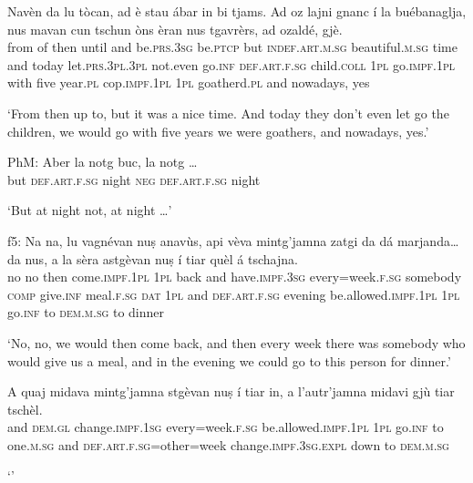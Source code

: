 \begin{linenumbers}
\gll    Navèn da lu tòcan, ad è stau ábar in bi tjams. Ad oz lajni gnanc í la buébanaglja, nus mavan cun tschun òns èran nus tgavrèrs, ad ozaldé, gjè.\\
from of then until and  be.\textsc{prs.3sg} be.\textsc{ptcp} but \textsc{indef.art.m.sg} beautiful.\textsc{m.sg} time and today let.\textsc{prs.3pl.3pl} not.even go.\textsc{inf} \textsc{def.art.f.sg} child.\textsc{coll} \textsc{1pl} go.\textsc{impf.1pl} with five year.\textsc{pl}  cop.\textsc{impf.1pl} \textsc{1pl} goatherd.\textsc{pl} and nowadays, yes{}    \\
\end{linenumbers}
\medskip
\glt `From then up to, but it was a nice time. And today they don’t even let go the children, we would go with five years we were goathers, and nowadays, yes.'
\medskip

\begin{linenumbers}
\gll  PhM: Aber la notg buc, la notg …\\
\textsc{} but \textsc{def.art.f.sg} night  \textsc{neg} \textsc{def.art.f.sg} night  \\
\end{linenumbers}
\medskip
\glt `But at night not, at night …'
\medskip

\begin{linenumbers}
\gll f5: Na na, lu vagnévan nuṣ anavùs, api vèva mintg’jamna zatgi da dá marjanda… da nus, a la sèra astgèvan nuṣ í tiar quèl á tschajna.\\
\textsc{} no no then come.\textsc{impf.1pl} \textsc{1pl} back and have.\textsc{impf.3sg} every=week.\textsc{f.sg} somebody   \textsc{comp} give.\textsc{inf} meal.\textsc{f.sg} \textsc{dat} \textsc{1pl} and \textsc{def.art.f.sg} evening be.allowed.\textsc{impf.1pl} \textsc{1pl} go.\textsc{inf} to \textsc{dem.m.sg} to dinner\\
\end{linenumbers}
\medskip
\glt `No, no, we would then come back, and then every week there was somebody who would give us a meal, and in the evening we could go to this person for dinner.'
\medskip

\begin{linenumbers}
\gll    A quaj midava mintg’jamna stgèvan nuṣ í tiar in, a l’autr’jamna midavi gjù tiar tschèl. \\
and \textsc{dem.gl} change.\textsc{impf.1sg} every=week.\textsc{f.sg} be.allowed.\textsc{impf.1pl}  \textsc{1pl} go.\textsc{inf} to one.\textsc{m.sg} and \textsc{def.art.f.sg=}other=week   change.\textsc{impf.3sg.expl} down to \textsc{dem.m.sg} \\
\end{linenumbers}
\medskip
\glt `'
\medskip

